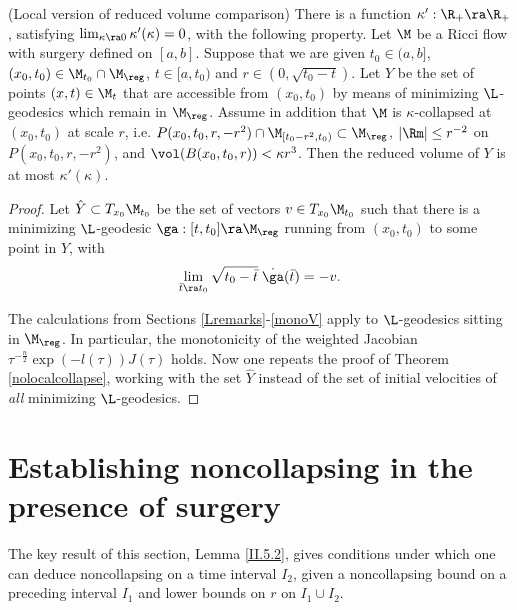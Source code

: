 \begin{lemma}
  \label{lem:kl-reduced-l-geometry-existence-reduced-volume}
(Local version of reduced volume comparison)
\label{localreducedvolume}
There is a function $\kappa':\R_+\ra \R_+$, satisfying
$\lim_{\kappa\ra 0}\kappa'(\kappa)=0$, with the following property.
Let $\M$ be a Ricci flow with surgery defined on $[a,b]$. Suppose
that we are given $t_0\in (a,b]$,
$(x_0,t_0)\in \M_{t_0}\cap \M_{\reg}$, $t\in [a,t_0)$ and
$r \in (0,\sqrt{t_0-t})$.  Let $Y$ be the set of points $(x,t)\in \M_t$
that are accessible from $(x_0,t_0)$ by means of minimizing $\L$-geodesics
which remain in $\M_{\reg}$.  Assume
in addition that
$\M$ is $\kappa$-collapsed at $(x_0,t_0)$ at scale $r$, i.e.
$P(x_0,t_0,r,-r^2) \cap \M_{[t_0 - r^2, t_0)} \subset\M_{\reg}$,
$|\Rm|\leq r^{-2}$ on
$P(x_0,t_0,r,-r^2)$, and $\vol(B(x_0,t_0,r))<\kappa r^3$.
Then  the reduced volume of $Y$ is at most
$\kappa'(\kappa)$.
\end{lemma}
\begin{proof}
Let $\hat Y\subset T_{x_0}\M_{t_0}$ be the set of vectors
$v\in T_{x_0}\M_{t_0}$
such that there is a minimizing $\L$-geodesic $\ga:[t,t_0]\ra \M_{\reg}$
 running from $(x_0,t_0)$ to some point in $Y$, with
\begin{equation}
\lim_{\bar t\ra t_0}\sqrt{t_0-\bar t}\;\dot{\ga}(\bar t)=-v.
\end{equation}

\noindent
The calculations from Sections \ref{Lremarks}-\ref{monoV}
apply to $\L$-geodesics sitting in $\M_{\reg}$.
In particular, the monotonicity of the weighted Jacobian
$\tau^{-\frac{n}{2}}\exp(-l(\tau))J(\tau)$ holds.  Now one repeats
 the proof of Theorem \ref{nolocalcollapse}, working with the set $\hat Y$
instead of  the set of initial velocities of {\em all} minimizing
$\L$-geodesics.
\end{proof}


\section{Establishing noncollapsing in the presence of surgery}
\label{II.5.2section}

The key result of this section, Lemma \ref{II.5.2},
gives conditions under which
one can deduce noncollapsing on a time interval $I_2$, given
a noncollapsing bound on a preceding interval $I_1$ and
lower bounds on $r$ on $I_1\cup I_2$.

